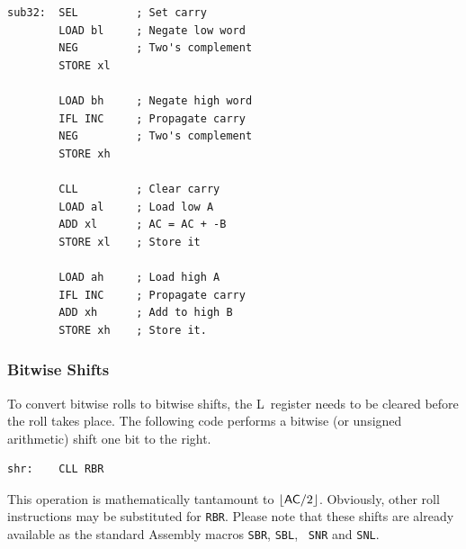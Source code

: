 \documentclass[11pt,a4paper,twocolumns]{article}
\newcommand\register[1]{\textsf{#1}}
\newcommand\A{\register{AC}}
\newcommand\Lreg{\register{L}}
\begin{document}
\begin{verbatim}
sub32:  SEL         ; Set carry
        LOAD bl     ; Negate low word
        NEG         ; Two's complement
        STORE xl

        LOAD bh     ; Negate high word
        IFL INC     ; Propagate carry
        NEG         ; Two's complement
        STORE xh

        CLL         ; Clear carry
        LOAD al     ; Load low A
        ADD xl      ; AC = AC + -B
        STORE xl    ; Store it

        LOAD ah     ; Load high A
        IFL INC     ; Propagate carry
        ADD xh      ; Add to high B
        STORE xh    ; Store it.
\end{verbatim}


%
%
%

\subsubsection{Bitwise Shifts}

To convert bitwise rolls to bitwise shifts, the \Lreg\ register needs
to be cleared before the roll takes place. The following code performs
a bitwise (or unsigned arithmetic) shift one bit to the right.

\begin{verbatim}
shr:    CLL RBR
\end{verbatim}

This operation is mathematically tantamount to
$\lfloor\mbox{\A}/2\rfloor$. Obviously, other roll instructions may be
substituted for {\tt RBR}. Please note that these shifts are already
available as the standard Assembly macros {\tt SBR}, {\tt SBL}, {\tt
  SNR} and {\tt SNL}.
\end{document}
